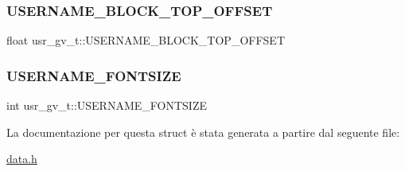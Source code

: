 \subsubsection{\texorpdfstring{U\+S\+E\+R\+N\+A\+M\+E\+\_\+\+B\+L\+O\+C\+K\+\_\+\+T\+O\+P\+\_\+\+O\+F\+F\+S\+ET}{USERNAME\_BLOCK\_TOP\_OFFSET}}
{\footnotesize\ttfamily float usr\+\_\+gv\+\_\+t\+::\+U\+S\+E\+R\+N\+A\+M\+E\+\_\+\+B\+L\+O\+C\+K\+\_\+\+T\+O\+P\+\_\+\+O\+F\+F\+S\+ET}

\mbox{\label{structusr__gv__t_a9f98fe0caf526ac025f34b2767f763d7}} 
\subsubsection{\texorpdfstring{U\+S\+E\+R\+N\+A\+M\+E\+\_\+\+F\+O\+N\+T\+S\+I\+ZE}{USERNAME\_FONTSIZE}}
{\footnotesize\ttfamily int usr\+\_\+gv\+\_\+t\+::\+U\+S\+E\+R\+N\+A\+M\+E\+\_\+\+F\+O\+N\+T\+S\+I\+ZE}



La documentazione per questa struct è stata generata a partire dal seguente file\+:\begin{DoxyCompactItemize}
\item 
\hyperlink{data_8h}{data.\+h}\end{DoxyCompactItemize}

